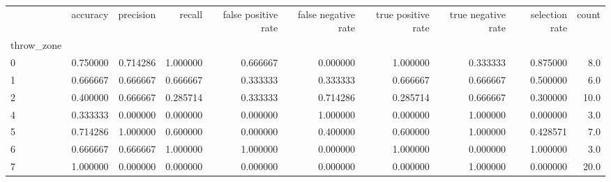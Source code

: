 \begin{tabular}{lrrrrrrrrr}
\toprule
{} &  accuracy &  precision &    recall &  false positive rate &  false negative rate &  true positive rate &  true negative rate &  selection rate &  count \\
throw\_zone &           &            &           &                      &                      &                     &                     &                 &        \\
\midrule
0          &  0.750000 &   0.714286 &  1.000000 &             0.666667 &             0.000000 &            1.000000 &            0.333333 &        0.875000 &    8.0 \\
1          &  0.666667 &   0.666667 &  0.666667 &             0.333333 &             0.333333 &            0.666667 &            0.666667 &        0.500000 &    6.0 \\
2          &  0.400000 &   0.666667 &  0.285714 &             0.333333 &             0.714286 &            0.285714 &            0.666667 &        0.300000 &   10.0 \\
4          &  0.333333 &   0.000000 &  0.000000 &             0.000000 &             1.000000 &            0.000000 &            1.000000 &        0.000000 &    3.0 \\
5          &  0.714286 &   1.000000 &  0.600000 &             0.000000 &             0.400000 &            0.600000 &            1.000000 &        0.428571 &    7.0 \\
6          &  0.666667 &   0.666667 &  1.000000 &             1.000000 &             0.000000 &            1.000000 &            0.000000 &        1.000000 &    3.0 \\
7          &  1.000000 &   0.000000 &  0.000000 &             0.000000 &             0.000000 &            0.000000 &            1.000000 &        0.000000 &   20.0 \\
\bottomrule
\end{tabular}
